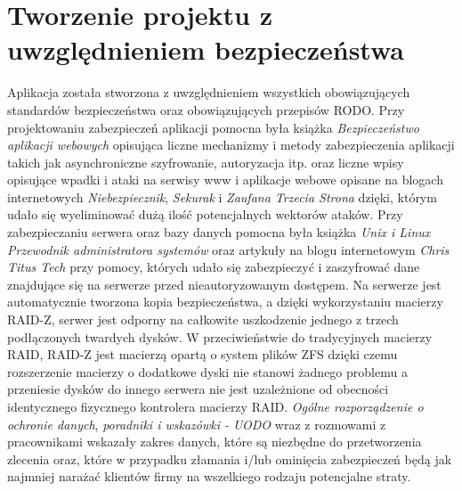 \documentclass[12pt,a4paper]{article}
\begin{document}
	\section{Tworzenie projektu z uwzględnieniem bezpieczeństwa}
		\indent Aplikacja została stworzona z uwzględnieniem wszystkich obowiązujących standardów bezpieczeństwa oraz obowiązujących przepisów RODO.
		Przy projektowaniu zabezpieczeń aplikacji pomocna była książka \emph{Bezpieczeństwo aplikacji webowych}\cite{BAW} opisująca liczne mechanizmy i metody zabezpieczenia aplikacji
		takich jak asynchroniczne szyfrowanie, autoryzacja itp. oraz liczne wpisy opisujące wpadki i ataki na serwisy www i aplikacje webowe opisane na blogach internetowych
		\emph{Niebezpiecznik}\cite{Nieb}, \emph{Sekurak}\cite{Sek} i \emph{Zaufana Trzecia Strona}\cite{ZTS} dzięki, którym udało się wyeliminować dużą ilość potencjalnych wektorów ataków. 
		Przy zabezpieczaniu serwera oraz bazy danych pomocna była książka \emph{Unix i Linux Przewodnik administratora systemów}\cite{Unix} oraz artykuły na blogu internetowym
		\emph{Chris Titus Tech}\cite{CTT} przy pomocy, których udało się zabezpieczyć i zaszyfrować dane znajdujące się na serwerze przed nieautoryzowanym dostępem. Na serwerze
		jest automatycznie tworzona kopia bezpieczeństwa, a dzięki wykorzystaniu macierzy RAID-Z, serwer jest odporny na całkowite uszkodzenie jednego z trzech podłączonych twardych dysków.
		W przeciwieństwie do tradycyjnych macierzy RAID, RAID-Z jest macierzą opartą o system plików ZFS dzięki czemu rozszerzenie macierzy o dodatkowe dyski nie stanowi żadnego problemu
		a przeniesie dysków do innego serwera nie jest uzależnione od obecności identycznego fizycznego kontrolera macierzy RAID.
		\emph{Ogólne rozporządzenie o ochronie danych}\cite{RODO}, \emph{poradniki i wskazówki - UODO}\cite{UODO} wraz z rozmowami z pracownikami wskazały
		zakres danych, które są niezbędne do przetworzenia zlecenia oraz, które w przypadku złamania i/lub ominięcia zabezpieczeń będą jak najmniej
		narażać klientów firmy na wszelkiego rodzaju potencjalne straty.  
	\newpage
	
\end{document}
